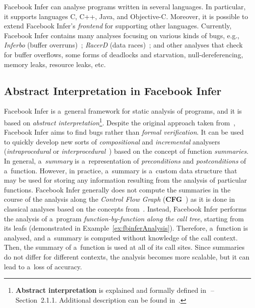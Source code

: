 Facebook Infer can analyse programs written in several languages. In
particular, it supports languages C, C++, Java, and Objective-C. Moreover, it
is possible to extend Facebook Infer's \emph{frontend} for supporting other
languages. Currently, Facebook Infer contains many analyses focusing on various
kinds of bugs, e.g., \emph{Inferbo} (buffer overruns)~\cite{inferboOnline};
\emph{RacerD} (data races)~\cite{racerD, racerDOnline,
staticRaceDetectorTruePositive}; and other analyses that check for buffer
overflows, some forms of deadlocks and starvation, null-dereferencing, memory
leaks, resource leaks, etc.

\subsection{Abstract Interpretation in Facebook Infer}

Facebook Infer is a~general framework for static analysis of programs, and it
is based on \emph{abstract interpretation}\footnote{\textbf{Abstract
interpretation} is explained and formally
defined in~\cite{harmimBP}\,--\,Section~2.1.1. Additional description can be
found in~\cite{AIBasedFormalMethodsCousot, AILatticeModelCousot,
AIInNutshellCousot, AICousotWeb, favAI, projectPracticeMarcin2018,
wideningNarrowingCousot, programAnalysisNielson, staticAnalysisMoller,
favLatticesAndFixpoints}.}. Despite the original approach taken
from~\cite{inferBiabduction}, Facebook Infer aims to find bugs rather than
\emph{formal verification}. It can be used to quickly develop new sorts of
\emph{compositional} and \emph{incremental} analysers (\emph{intraprocedural}
or \emph{interprocedural}~\cite{programAnalysisNielson}) based on the concept
of function \emph{summaries}. In general, a~\emph{summary} is a~representation
of \emph{preconditions} and \emph{postconditions} of a~function. However, in
practice, a~summary is a~custom data structure that may be used for storing
any information resulting from the analysis of particular functions. Facebook
Infer generally does not compute the summaries in the course of the analysis
along the \emph{Control Flow Graph}
(\textbf{CFG}~\cite{controlFlowAnalysisAllen}) as it is done in classical
analyses based on the concepts from~\cite{dataflowAnalysisGraphReachability,
dataflowAnalysisApproaches}. Instead, Facebook Infer performs the analysis of
a~program \emph{function-by-function along the call tree}, starting from its
leafs (demonstrated in Example~\ref{ex:fbinferAnalysis}). Therefore, a~function
is analysed, and a~summary is computed without knowledge of the call context.
Then, the summary of a~function is used at all of its call sites. Since
summaries do not differ for different contexts, the analysis becomes more
scalable, but it can lead to a~loss of accuracy.

